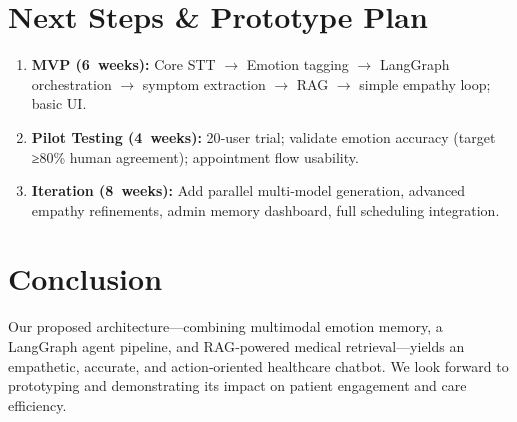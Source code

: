 \documentclass[11pt,a4paper]{article}
\begin{document}
\section{Next Steps \& Prototype Plan}
\begin{enumerate}[left=0pt]
  \item \textbf{MVP (6 weeks):} Core STT $\to$ Emotion tagging $\to$ LangGraph orchestration $\to$ symptom extraction $\to$ RAG $\to$ simple empathy loop; basic UI.
  \item \textbf{Pilot Testing (4 weeks):} 20‐user trial; validate emotion accuracy (target ≥80\% human agreement); appointment flow usability.
  \item \textbf{Iteration (8 weeks):} Add parallel multi‐model generation, advanced empathy refinements, admin memory dashboard, full scheduling integration.
\end{enumerate}

\section{Conclusion}
Our proposed architecture—combining multimodal emotion memory, a LangGraph agent pipeline, and RAG‐powered medical retrieval—yields an empathetic, accurate, and action‐oriented healthcare chatbot. We look forward to prototyping and demonstrating its impact on patient engagement and care efficiency.
\end{document}

